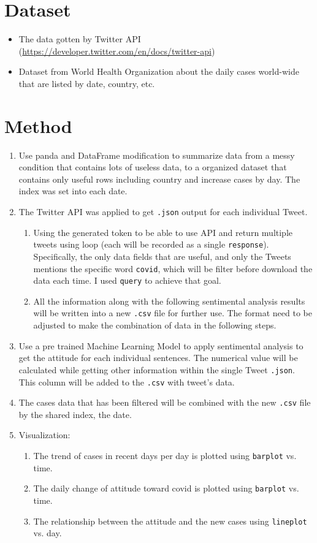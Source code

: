 \documentclass[a4paper, 12pt]{article}
\begin{document}
\section*{Dataset}
\begin{itemize}
    \item The data gotten by Twitter API (\url{https://developer.twitter.com/en/docs/twitter-api})
    \item Dataset from World Health Organization about the daily cases world-wide that are listed by date, country, etc.
\end{itemize}

\section*{Method}
\begin{enumerate}
    \item Use panda and DataFrame modification to summarize data from a messy condition that contains lots of useless data, to a organized dataset that contains only useful rows including country and increase cases by day. The index was set into each date.
    \item The Twitter API was applied to get \texttt{.json} output for each individual Tweet.
    \begin{enumerate}
        \item Using the generated token to be able to use API and return multiple tweets using loop (each will be recorded as a single \texttt{response}). Specifically, the only data fields that are useful, and only the Tweets mentions the specific word \texttt{covid}, which will be filter before download the data each time. I used \texttt{query} to achieve that goal.
        \item All the information along with the following sentimental analysis results will be written into a new \texttt{.csv} file for further use. The format need to be adjusted to make the combination of data in the following steps.
    \end{enumerate}
    \item Use a pre trained Machine Learning Model to apply sentimental analysis to get the attitude for each individual sentences. The numerical value will be calculated while getting other information within the single Tweet \texttt{.json}. This column will be added to the \texttt{.csv} with tweet's data.
    \item The cases data that has been filtered will be combined with the new \texttt{.csv} file by the shared index, the date.
    \item Visualization:
    \begin{enumerate}
        \item The trend of cases in recent days per day is plotted using \texttt{barplot} vs. time.
        \item The daily change of attitude toward covid is plotted using \texttt{barplot} vs. time.
        \item The relationship between the attitude and the new cases using \texttt{lineplot} vs. day.
    \end{enumerate}
\end{enumerate}
\end{document}
